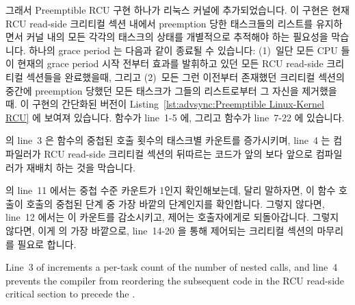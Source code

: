 그래서 Preemptible RCU 구현 하나가 리눅스 커널에 추가되었습니다.
이 구현은 현재 RCU read-side 크리티컬 섹션 내에서 preemption 당한 태스크들의
리스트를 유지하면서 커널 내의 모든 각각의 태스크의 상태를 개별적으로 추적해야
하는 필요성을 막습니다.
하나의 grace period 는 다음과 같이 종료될 수 있습니다: (1)~일단 모든 CPU 들이
현재의 grace period 시작 전부터 효과를 발휘하고 있던 모든 RCU read-side
크리티컬 섹션들을 완료했을때, 그리고 (2)~모든 그런 이전부터 존재했던 크리티컬
섹션의 중간에 preemption 당했던 모든 태스크가 그들의 리스트로부터 그 자신을
제거했을 때.
이 구현의 간단화된 버전이
Listing~\ref{lst:advsync:Preemptible Linux-Kernel RCU} 에 보여져 있습니다.
 함수가 line~1-5 에, 그리고 
함수가 line~7-22 에 있습니다.

 의 line~3 은  함수의 중첩된 호출
횟수의 태스크별 카운트를 증가시키며, line~4 는 컴파일러가 RCU read-side
크리티컬 섹션의 뒤따르는 코드가 앞의  보다 앞으로
컴파일러가 재배치 하는 것을 막습니다.

 의 line~11 에서는 중첩 수준 카운트가 1인지
확인해보는데, 달리 말하자면, 이 함수 호출이  호출의
중첩된 단계 중 가장 바깥의 단계인지를 확인합니다.
그렇지 않다면, line~12 에서는 이 카운트를 감소시키고, 제어는 호출자에게로
되돌아갑니다.
그렇지 않다면, 이게  의 가장 바깥으로, line~14-20 을 통해
제어되는 크리티컬 섹션의 마무리를 필요로 합니다.
\iffalse

Line~3 of  increments a per-task count of the
number of nested  calls, and
line~4 prevents the compiler from reordering the subsequent code in the
RCU read-side critical section to precede the .

